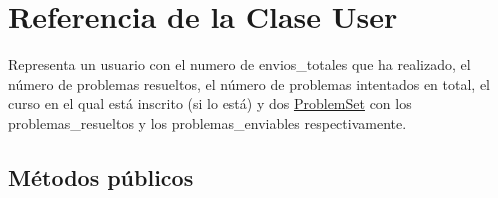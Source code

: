 \hypertarget{class_user}{}\section{Referencia de la Clase User}
\label{class_user}


Representa un usuario con el numero de envios\+\_\+totales que ha realizado, el número de problemas resueltos, el número de problemas intentados en total, el curso en el qual está inscrito (si lo está) y dos \mbox{\hyperlink{class_problem_set}{Problem\+Set}} con los problemas\+\_\+resueltos y los problemas\+\_\+enviables respectivamente.  


\subsection*{Métodos públicos}
